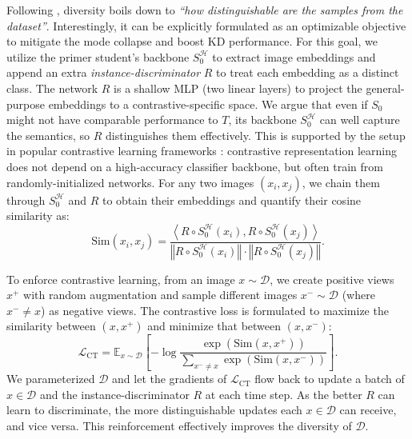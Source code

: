 \begin{foldable} %
    Following \citet{fang2021contrastive}, diversity boils down to \textit{``how distinguishable are the samples from the dataset''}.
    Interestingly, it can be explicitly formulated as an optimizable objective to mitigate the mode collapse and boost KD performance.
    For this goal, we utilize the primer student's backbone $S_{0}^{\mathcal{H}}$ to extract image embeddings and append an extra \textit{instance-discriminator} $R$ to treat each embedding as a distinct class.
    The network $R$ is a shallow MLP (two linear layers) to project the general-purpose embeddings to a contrastive-specific space.
    We argue that even if $S_0$ might not have comparable performance to $T$, its backbone $S_{0}^{\mathcal{H}}$ can well capture the semantics, so $R$ distinguishes them effectively.
    This is supported by the setup in popular contrastive learning frameworks \citep{chen2020simple,he2020momentum,zbontar2021barlow}: contrastive representation learning does not depend on a high-accuracy classifier backbone, but often train from randomly-initialized networks.
    For any two images $(x_i, x_j)$, we chain them through $S_{0}^{\mathcal{H}}$ and $R$ to obtain their embeddings and quantify their cosine similarity as:
    \begin{equation}
        \text{Sim}\left(x_i, x_j\right)=
            \frac{ \left\langle R \circ S_{0}^{\mathcal{H}}\left(x_i\right), R \circ S_{0}^{\mathcal{H}}\left(x_j\right)\right\rangle }
            { \left\Vert R \circ S_{0}^{\mathcal{H}}\left(x_i\right) \right\Vert \cdot\left\Vert R \circ S_{0}^{\mathcal{H}}\left(x_j\right) \right\Vert }.
    \end{equation}
\end{foldable}

\begin{foldable} %
    To enforce contrastive learning, from an image $x\sim\mathcal{D}$, we create positive views $x^{+}$ with random augmentation and sample different images $x^{-}\sim\mathcal{D}$ (where $x^{-} \neq x$) as negative views.
    The contrastive loss is formulated to maximize the similarity between $(x, x^{+})$ and minimize that between $(x, x^{-})$:
    \begin{equation} \label{eq:loss-contrastive}
        \mathcal{L}_{\text{CT}} = \mathbb{E}_{x \sim \mathcal{D}} \left[ -\log \frac{ \exp\left( \text{Sim}(x, x^{+}) \right) }{ \sum_{x^{-} \ne x} \exp\left( \text{Sim}(x, x^{-})  \right) } \right].
    \end{equation}
    We parameterized $\mathcal{D}$ and let the gradients of $\mathcal{L}_{\text{CT}}$ flow back to update a batch of $x \in \mathcal{D}$ and the instance-discriminator $R$ at each time step.
    As the better $R$ can learn to discriminate, the more distinguishable updates each $x \in \mathcal{D}$ can receive, and vice versa.
    This reinforcement effectively improves the diversity of $\mathcal{D}$.
\end{foldable}



